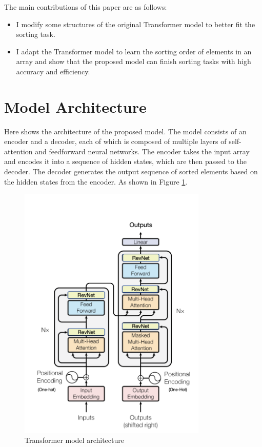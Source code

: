 \documentclass{article}
\begin{document}
The main contributions of this paper are as follows:
\begin{itemize}
    \item I modify some structures of the original Transformer model to better fit the sorting task.
    \item I adapt the Transformer model to learn the sorting order of elements in an array and show that the proposed model can finish sorting tasks with high accuracy and efficiency.
\end{itemize}


\section{Model Architecture}
Here shows the architecture of the proposed model. The model consists of an encoder and a decoder, each of which is composed of multiple layers of self-attention and feedforward neural networks. The encoder takes the input array and encodes it into a sequence of hidden states, which are then passed to the decoder. The decoder generates the output sequence of sorted elements based on the hidden states from the encoder. As shown in Figure \ref{Transformer model architecture}.

\begin{figure}
    \centering
    \includegraphics[width=0.8\textwidth]{picture/transformer.png}
    \caption{Transformer model architecture}
    \label{Transformer model architecture}
\end{figure}
\end{document}
